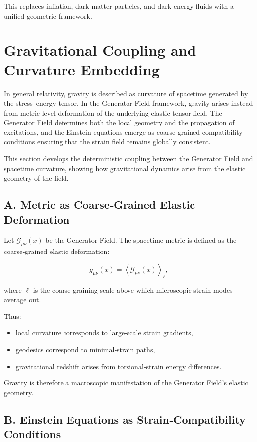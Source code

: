 \documentclass[reprint,amsmath,amssymb,aps,prl,floatfix]{revtex4-2}
\begin{document}
\begin{itemize}
This replaces inflation, dark matter particles, and dark energy fluids with a unified geometric framework.
\medskip

\section{Gravitational Coupling and Curvature Embedding}

In general relativity, gravity is described as curvature of spacetime generated by the stress–energy tensor. In the Generator Field framework, gravity arises instead from metric‑level deformation of the underlying elastic tensor field. The Generator Field determines both the local geometry and the propagation of excitations, and the Einstein equations emerge as coarse‑grained compatibility conditions ensuring that the strain field remains globally consistent.
\medskip

This section develops the deterministic coupling between the Generator Field and spacetime curvature, showing how gravitational dynamics arise from the elastic geometry of the field.

\subsection{A. Metric as Coarse‑Grained Elastic Deformation}

Let \(\mathcal{G}_{\mu\nu}(x)\) be the Generator Field.  
The spacetime metric is defined as the coarse‑grained elastic deformation:

\[
g_{\mu\nu}(x)
=
\left\langle
\mathcal{G}_{\mu\nu}(x)
\right\rangle_{\ell},
\]

where \(\ell\) is the coarse‑graining scale above which microscopic strain modes average out.

Thus:
\begin{itemize}
\item local curvature corresponds to large‑scale strain gradients,  
\item geodesics correspond to minimal‑strain paths,  
\item gravitational redshift arises from torsional‑strain energy differences.
\end{itemize}

Gravity is therefore a macroscopic manifestation of the Generator Field’s elastic geometry.

\subsection{B. Einstein Equations as Strain‑Compatibility Conditions}


\end{itemize}
\end{document}
